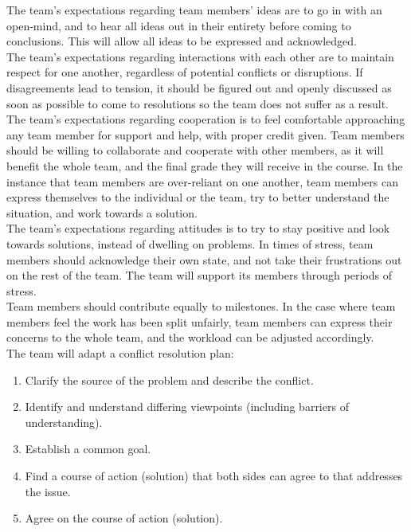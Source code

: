 \documentclass{article}
\begin{document}
The team's expectations regarding team members' ideas are to go in with an open-mind, and to
hear all ideas out in their entirety before coming to conclusions. This will allow all ideas
to be expressed and acknowledged.\\
\indent The team's expectations regarding interactions with each other are to maintain respect
for one another, regardless of potential conflicts or disruptions. If disagreements lead to tension,
it should be figured out and openly discussed as soon as possible to come to resolutions so the team
does not suffer as a result.\\
\indent The team's expectations regarding cooperation is to feel comfortable approaching any team member
for support and help, with proper credit given. Team members should be willing to collaborate and cooperate
with other members, as it will benefit the whole team, and the final grade they will receive in the course.
In the instance that team members are over-reliant on one another, team members can express themselves to the
individual or the team, try to better understand the situation, and work towards a solution.\\
\indent The team's expectations regarding attitudes is to try to stay positive and look towards solutions, instead
of dwelling on problems. In times of stress, team members should acknowledge their own state, and not take their
frustrations out on the rest of the team. The team will support its members through periods of stress.\\
\indent Team members should contribute equally to milestones. In the case where team members feel the work has been
split unfairly, team members can express their concerns to the whole team, and the workload can be adjusted accordingly.\\
\indent The team will adapt a conflict resolution plan:
\begin{enumerate}
  \item Clarify the source of the problem and describe the conflict.
  \item Identify and understand differing viewpoints (including barriers of understanding).
  \item Establish a common goal.
  \item Find a course of action (solution) that both sides can agree to that addresses the issue.
  \item Agree on the course of action (solution).
\end{enumerate}
\end{document}
